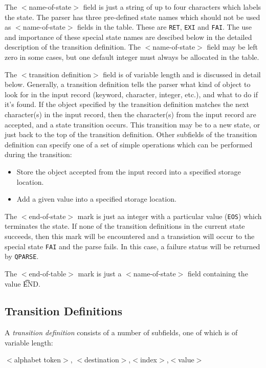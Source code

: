 The $<$name-of-state$>$ field is just a string of up to four
characters which labels the state. The parser has three pre-defined
state names which should not be used as $<$name-of-state$>$ fields in the
table. 
These are {\tt RET}, {\tt EXI} and {\tt FAI}. The use and importance of
these special state names are descibed below in the detailed
description of the transition definition. The $<$name-of-state$>$ field may
be left zero in some cases, but one default integer must always be
allocated in the table.

The $<$transition definition$>$ field is of variable length and is
discussed in detail below. Generally, a transition definition tells the
parser what kind of object to look for in the input record (keyword,
character, integer, etc.), and what to do if it's found. If the object
specified by the transition definition matches the next character(s) in
the input record, then the character(s) from the input record are accepted,
and a state transition occurs. This transition may be to a new state,
or just back to the top of the transition definition. Other subfields
of the transition definition can specify one of a set of simple
operations which can be performed during the transition:
\begin{itemize}
\item Store the object accepted from the input record into a
specified storage location.
\item Add a given value into a specified storage location.
\end{itemize}
The $<$end-of-state$>$ mark is just aa integer with a particular value
({\tt EOS}) which terminates the state. If none of the transition
definitions in the current state succeeds, then this mark will be
encountered and a transistion will occur to the special state {\tt FAI} and
the parse fails. In this case, a failure status will be returned by
{\tt QPARSE}.

The $<$end-of-table$>$ mark is just a $<$name-of-state$>$ field containing
the value {\t END}.
\subsection{\sf Transition Definitions}
A {\em transition definition} consists of a number of subfields, one of
which is of variable length:

$<$alphabet token$>$, $<$destination$>$,$<$index$>$,$<$value$>$

